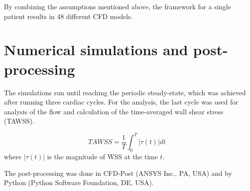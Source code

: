 By combining the assumptions mentioned above, the framework for a single patient results in 48 different CFD models. \par


\section{Numerical simulations and post-processing}
The simulations run until reaching the periodic steady-state, which was achieved after running three cardiac cycles. For the analysis, the last cycle was used for analysis of the flow and calculation of the time-averaged wall shear stress (TAWSS). 

\begin{equation}
TAWSS=\frac{1}{T}\int_{0}^{T} |\tau(t)|dt
\label{eq:tawss}
\end{equation}
where $|\tau(t)|$ is the magnitude of WSS at the time $t$. \par

The post-processing was done in CFD-Post (ANSYS Inc., PA, USA) and by Python (Python Software Foundation, DE, USA).

